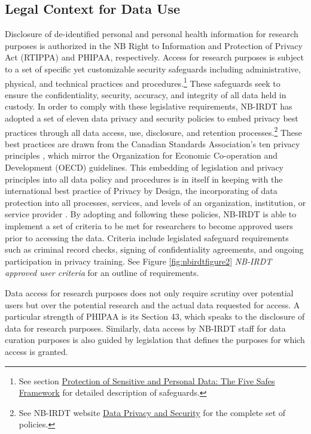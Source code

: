 \hypertarget{nbirdt-legaluse}{%
\subsection{Legal Context for Data Use}\label{nbirdt-legaluse}}

Disclosure of de-identified personal and personal health information for research purposes is authorized in the NB Right to Information and Protection of Privacy Act (RTIPPA) and PHIPAA, respectively. Access for research purposes is subject to a set of specific yet customizable security safeguards including administrative, physical, and technical practices and procedures.\footnote{See section \protect\hyperlink{nbirdt-fivesafes}{Protection of Sensitive and Personal Data: The Five Safes Framework} for detailed description of safeguards.} These safeguards seek to ensure the confidentiality, security, accuracy, and integrity of all data held in custody. In order to comply with these legislative requirements, NB-IRDT has adopted a set of eleven data privacy and security policies to embed privacy best practices through all data access, use, disclosure, and retention processes.\footnote{See NB-IRDT website \href{https://www.nbirdt.ca/data-privacy-and-security}{Data Privacy and Security} for the complete set of policies.} These best practices are drawn from the Canadian Standards Association's ten privacy principles \citep{governmentofcanada2000a, officeoftheprivacycommissionerofcanada2019}, which mirror the Organization for Economic Co-operation and Development (OECD) guidelines. This embedding of legislation and privacy principles into all data policy and procedures is in itself in keeping with the international best practice of Privacy by Design, the incorporating of data protection into all processes, services, and levels of an organization, institution, or service provider \citep{hertzman2012}. By adopting and following these policies, NB-IRDT is able to implement a set of criteria to be met for researchers to become approved users prior to accessing the data. Criteria include legislated safeguard requirements such as criminal record checks, signing of confidentiality agreements, and ongoing participation in privacy training. See Figure \ref{fig:nbirdtfigure2} \emph{NB-IRDT approved user criteria} for an outline of requirements.

Data access for research purposes does not only require scrutiny over potential users but over the potential research and the actual data requested for access. A particular strength of PHIPAA is its Section 43, which speaks to the disclosure of data for research purposes. Similarly, data access by NB-IRDT staff for data curation purposes is also guided by legislation that defines the purposes for which access is granted.

